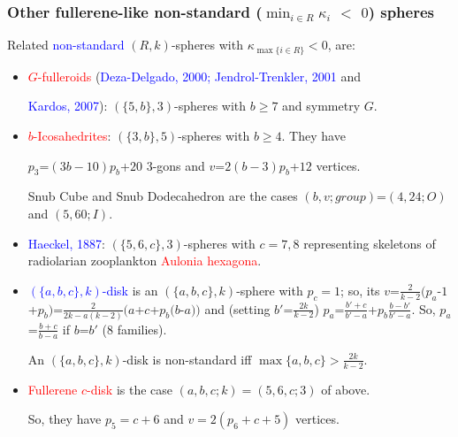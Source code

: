 \documentclass{beamer}
\begin{document}
\begin{frame}\frametitle{Other fullerene-like non-standard 
($\min_{i\in R}\kappa_i$  $<$ $0$)  
 spheres}
\vspace{-2mm}

Related  \textcolor{blue}{non-standard}  $(R,k)$-spheres 
 with
$\kappa_{\max\{i\in R\}}$$<$$0$, are:
\begin{itemize}
\item \textcolor{red}{$G$-fulleroids} (\textcolor{blue}{Deza-Delgado,
2000; Jendrol-Trenkler, 2001} and

\textcolor{blue}{Kardos, 2007}): $(\{5,b\},3)$-spheres
with $b$$\ge$$ 7$ and symmetry $G$.

\item \textcolor{red}{$b$-Icosahedrites}: $(\{3,b\},5)$-spheres with $b\ge 4$. 
They have
  
$p_3$=$(3b-10)p_b$+$20$ $3$-gons and  $v$=$2(b-3)p_b$+$12$ vertices.

Snub Cube and Snub Dodecahedron are the cases $(b,v;group)$=$(4,24;O)$  
and  $(5,60;I)$.

\item \textcolor{blue}{Haeckel, 1887}: $(\{5,6,c\},3)$-spheres
 with $c=7,8$ representing
skeletons of  radiolarian zooplankton \textcolor{red}{Aulonia hexagona}.


\item 
\textcolor{blue}{$(\{a,b,c\},k)$-disk} is an   $(\{a,b,c\},k)$-sphere with $p_c=1$;
so, its
$v$=$\frac{2}{k-2}(p_a$-$1$+$p_b)$=$\frac{2}{2k-a(k-2)}(a$+$c$+$p_b(b$-$a))$ 
and (setting $b'$=$\frac{2k}{k-2}$) 
 $p_a$=$\frac{b'+c}{b'-a}$+$p_b\frac{b-b'}{b'-a}$. 
So, $p_a$=$\frac{b+c}{b-a}$ if $b$=$b'$ ($8$ families). 

An $(\{a,b,c\},k)$-disk is non-standard iff $\max\{a,b,c\}>\frac{2k}{k-2}$.
\item \textcolor{red}{Fullerene $c$-disk} is  the case 
$(a,b,c;k)=(5,6,c;3)$ of above.
 
So, they have $p_5=c+6$  and $v=2(p_6+c+5)$ vertices.



\end{itemize}
\end{frame}
\end{document}
